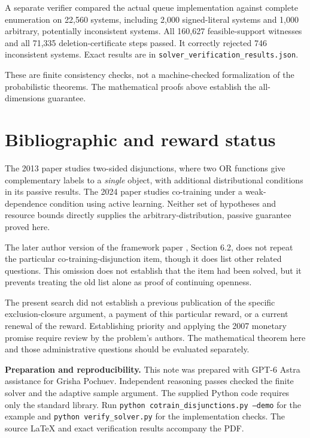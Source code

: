 \documentclass[11pt,a4paper]{article}
\begin{document}
A separate verifier compared the actual queue implementation against
complete enumeration on 22,560 systems, including 2,000 signed-literal
systems and 1,000 arbitrary, potentially inconsistent systems.
All 160,627 feasible-support witnesses and all 71,335 deletion-certificate
steps passed. It correctly rejected 746 inconsistent systems.
Exact results are in \texttt{solver\_verification\_results.json}.

These are finite consistency checks, not a machine-checked formalization
of the probabilistic theorems. The mathematical proofs above establish
the all-dimensions guarantee.

\section{Bibliographic and reward status}

The 2013 paper \cite{bbel13} studies two-sided disjunctions, where two
OR functions give complementary labels to a \emph{single} object, with
additional distributional conditions in its passive results.
The 2024 paper \cite{dmrt24} studies co-training under a weak-dependence
condition using active learning. Neither set of hypotheses and resource
bounds directly supplies the arbitrary-distribution, passive guarantee
proved here.

The later author version of the framework paper \cite{bb10}, Section 6.2,
does not repeat the particular co-training-disjunction item, though it
does list other related questions. This omission does not establish
that the item had been solved, but it prevents treating the old list alone
as proof of continuing openness.

The present search did not establish a previous publication of the
specific exclusion-closure argument, a payment of this particular reward,
or a current renewal of the reward. Establishing priority and applying
the 2007 monetary promise require review by the problem's authors.
The mathematical theorem here and those administrative questions should
be evaluated separately.

\medskip
\textbf{Preparation and reproducibility.}
This note was prepared with GPT-6 Astra assistance for Grisha Pochuev.
Independent reasoning passes checked the finite solver and the adaptive
sample argument. The supplied Python code requires only the standard
library. Run \texttt{python cotrain\_disjunctions.py --demo} for the example
and \texttt{python verify\_solver.py} for the implementation checks.
The source \LaTeX{} and exact verification results accompany the PDF.
\end{document}
